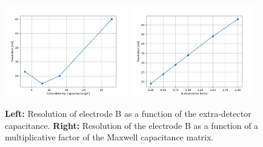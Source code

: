 \begin{figure}
\centering
\includegraphics[width=0.48\textwidth]{Figures/Electrodes/scan_capacitance.png}
\includegraphics[width=0.48\textwidth]{Figures/Electrodes/scan_alpha.png}
\caption{
\textbf{Left:} Resolution of electrode B as a function of the extra-detector capacitance.
\textbf{Right:} Resolution of the electrode B as a function of a multiplicative factor of the Maxwell capacitance matrix.
}
\label{fig:planar38-scan}
\end{figure}



